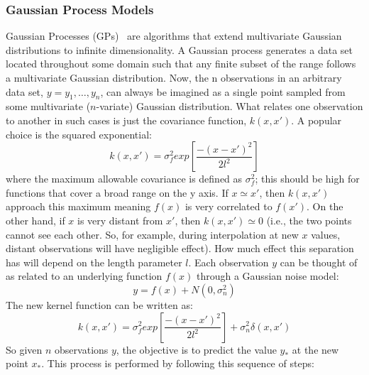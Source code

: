 \subsubsection{Gaussian Process Models}
\label{sec:GPM}
Gaussian Processes (GPs)~\cite{Rasmussen_GPM} are algorithms that extend multivariate Gaussian distributions to infinite dimensionality. A Gaussian process generates a data set located throughout some domain such that any finite subset of the range follows a multivariate Gaussian distribution. Now, the n observations in an arbitrary data set, $y={y_1,\ldots,y_n}$, can always be imagined as a single point sampled from some multivariate ($n$-variate) Gaussian distribution.
What relates one observation to another in such cases is just the covariance function, $k(x,x')$. A popular choice is the squared exponential:
\begin{equation}
k(x,x')=\sigma_{f}^{2}  exp \left [ \frac{-(x-x')^2}{2 l^2} \right ]
\end{equation}
where the maximum allowable covariance is defined as $\sigma_{f}^{2}$; this should be high for functions that cover a broad range on the y axis. If $x \simeq x'$, then $k(x,x')$ approach this maximum meaning $f(x)$ is very correlated to $f(x')$. On the other hand, if $x$ is very distant from $x'$, then $k(x,x' ) \simeq 0$ (i.e., the two points cannot see each other.
So, for example, during interpolation at new $x$ values, distant observations will have negligible effect). How much effect this separation has will depend on the length parameter $l$.
Each observation $y$ can be thought of as related to an underlying function $f(x)$ through a Gaussian noise model:
\begin{equation}
y=f(x)+N(0,\sigma_{n}^{2})
\end{equation}
The new kernel function can be written as:
\begin{equation}
k(x,x')=\sigma_{f}^{2}  exp \left [ \frac{-(x-x')^2}{2 l^2} \right ] + \sigma_{n}^{2} \delta(x,x')
\end{equation}
So given $n$ observations $y$, the objective is to predict the value $y_*$ at the new point $x_*$. This process is performed by following this sequence of steps:
